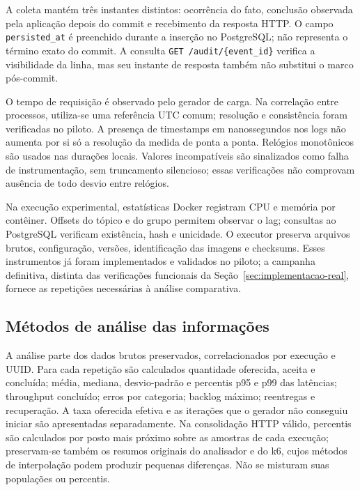 A coleta mantém três instantes distintos: ocorrência do fato, conclusão observada pela aplicação depois do commit e recebimento da resposta HTTP. O campo \texttt{persisted\_at} é preenchido durante a inserção no PostgreSQL; não representa o término exato do commit. A consulta \texttt{GET /audit/\{event\_id\}} verifica a visibilidade da linha, mas seu instante de resposta também não substitui o marco pós-commit.

O tempo de requisição é observado pelo gerador de carga. Na correlação entre processos, utiliza-se uma referência UTC comum; resolução e consistência foram verificadas no piloto. A presença de timestamps em nanossegundos nos logs não aumenta por si só a resolução da medida de ponta a ponta. Relógios monotônicos são usados nas durações locais. Valores incompatíveis são sinalizados como falha de instrumentação, sem truncamento silencioso; essas verificações não comprovam ausência de todo desvio entre relógios.

Na execução experimental, estatísticas Docker registram CPU e memória por contêiner. Offsets do tópico e do grupo permitem observar o lag; consultas ao PostgreSQL verificam existência, hash e unicidade. O executor preserva arquivos brutos, configuração, versões, identificação das imagens e checksums. Esses instrumentos já foram implementados e validados no piloto; a campanha definitiva, distinta das verificações funcionais da Seção~\ref{sec:implementacao-real}, fornece as repetições necessárias à análise comparativa.

\subsection{Métodos de análise das informações}
A análise parte dos dados brutos preservados, correlacionados por execução e UUID. Para cada repetição são calculados quantidade oferecida, aceita e concluída; média, mediana, desvio-padrão e percentis p95 e p99 das latências; throughput concluído; erros por categoria; backlog máximo; reentregas e recuperação. A taxa oferecida efetiva e as iterações que o gerador não conseguiu iniciar são apresentadas separadamente. Na consolidação HTTP válido, percentis são calculados por posto mais próximo sobre as amostras de cada execução; preservam-se também os resumos originais do analisador e do k6, cujos métodos de interpolação podem produzir pequenas diferenças. Não se misturam suas populações ou percentis.

